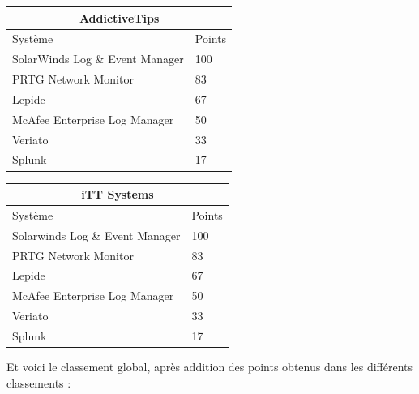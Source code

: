 \documentclass[paper=a4, fontsize=11pt]{scrartcl}
\begin{document}
    \begin{tabular}{ |p{6cm}|p{1cm}|  }
     \hline
     \multicolumn{2}{|c|}{AddictiveTips} \\
     \hline
     Système & Points\\
     \hline
     SolarWinds Log \& Event Manager & 100\\
     PRTG Network Monitor & 83\\
     Lepide & 67\\
     McAfee Enterprise Log Manager & 50\\
     Veriato & 33\\
     Splunk & 17\\
     \hline
    \end{tabular}
\hfill
    \begin{tabular}{ |p{6cm}|p{1cm}|  }
     \hline
     \multicolumn{2}{|c|}{iTT Systems} \\
     \hline
     Système & Points\\
     \hline
     Solarwinds Log \& Event Manager & 100\\
     PRTG Network Monitor & 83\\
     Lepide & 67\\
     McAfee Enterprise Log Manager & 50\\
     Veriato & 33\\
     Splunk & 17\\
     \hline
    \end{tabular}

Et voici le classement global, après addition des points obtenus dans les différents classements :
\end{document}
